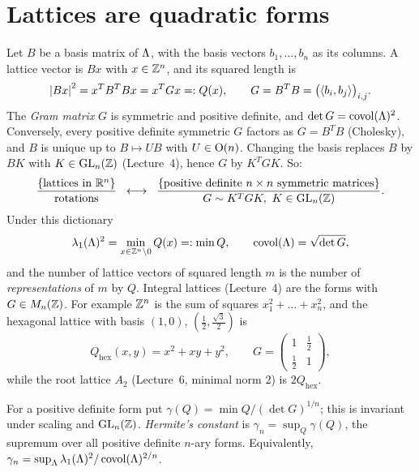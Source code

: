 \section{Lattices are quadratic forms}
\label{NT:sec:forms}

Let $B$ be a basis matrix of $\Lambda$, with the basis vectors $b_1,\dots,b_n$ as its columns. A lattice
vector is $Bx$ with $x\in\mathbb{Z}^n$, and its squared length is
\[
  \left\lvert Bx \right\rvert^2=x^TB^TBx=x^TGx=:Q(x),\qquad G=B^TB=\big(\langle b_i, b_j\rangle\big)_{i,j}.
\]
The \emph{Gram matrix} $G$ is symmetric and positive definite, and $\det G=\operatorname{covol}(\Lambda)^2$. Conversely,
every positive definite symmetric $G$ factors as $G=B^TB$ (Cholesky), and $B$ is unique up to
$B\mapsto UB$ with $U\in\mathrm{O}(n)$. Changing the basis replaces $B$ by $BK$ with $K\in\mathrm{GL}_n(\mathbb{Z})$
(Lecture~4), hence $G$ by $K^TGK$. So:
\[
  \frac{\{\text{lattices in }\mathbb{R}^n\}}{\text{rotations}}
  \;\;\longleftrightarrow\;\;
  \frac{\{\text{positive definite }n\times n\text{ symmetric matrices}\}}{G\sim K^TGK,\ K\in\mathrm{GL}_n(\mathbb{Z})} .
\]
Under this dictionary
\[
  \lambda_1(\Lambda)^2=\min_{x\in\mathbb{Z}^n\setminus0}Q(x)=:\min Q,\qquad \operatorname{covol}(\Lambda)=\sqrt{\det G},
\]
and the number of lattice vectors of squared length $m$ is the number of \emph{representations} of $m$
by $Q$. Integral lattices (Lecture~4) are the forms with $G\in M_n(\mathbb{Z})$. For example $\mathbb{Z}^n$ is the sum
of squares $x_1^2+\dots+x_n^2$, and the hexagonal lattice with basis $(1,0)$,
$(\tfrac12,\tfrac{\sqrt3}2)$ is
\[
  Q_{\mathrm{hex}}(x,y)=x^2+xy+y^2,\qquad G=\begin{pmatrix}1&\tfrac12\\ \tfrac12&1\end{pmatrix},
\]
while the root lattice $A_2$ (Lecture~6, minimal norm $2$) is $2Q_{\mathrm{hex}}$.

\begin{definition}\label{NT:def:hermite}
For a positive definite form put $\gamma(Q)=\min Q/(\det G)^{1/n}$; this is invariant under scaling and
$\mathrm{GL}_n(\mathbb{Z})$. \emph{Hermite's constant} is $\gamma_n=\sup_Q\gamma(Q)$, the supremum over all positive
definite $n$-ary forms. Equivalently, $\gamma_n=\sup_\Lambda\lambda_1(\Lambda)^2/\operatorname{covol}(\Lambda)^{2/n}$.
\end{definition}

